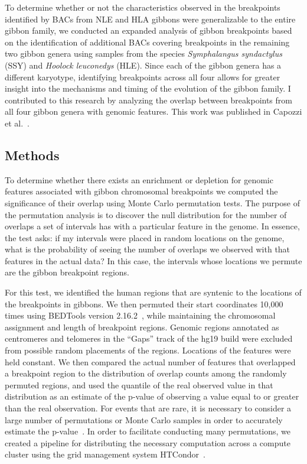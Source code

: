 To determine whether or not the characteristics observed in the breakpoints identified by BACs from NLE and HLA gibbons were generalizable to the entire gibbon family, we conducted an expanded analysis of gibbon breakpoints based on the identification of additional BACs covering breakpoints in the remaining two gibbon genera using samples from the species \emph{Symphalangus syndactylus} (SSY) and \emph{Hoolock leuconedys} (HLE). Since each of the gibbon genera has a different karyotype, identifying breakpoints across all four allows for greater insight into the mechanisms and timing of the evolution of the gibbon family. I contributed to this research by analyzing the overlap between breakpoints from all four gibbon genera with genomic features. This work was published in Capozzi et al.~\cite{Capozzi:2012bb}.

\subsection{Methods}

To determine whether there exists an enrichment or depletion for genomic features associated with gibbon chromosomal breakpoints we computed the significance of their overlap using Monte Carlo permutation tests. The purpose of the permutation analysis is to discover the null distribution for the number of overlaps a set of intervals has with a particular feature in the genome. In essence, the test asks: if my intervals were placed in random locations on the genome, what is the probability of seeing the number of overlaps we observed with that features in the actual data? In this case, the intervals whose locations we permute are the gibbon breakpoint regions.

For this test, we identified the human regions that are syntenic to the locations of the breakpoints in gibbons. We then permuted their start coordinates 10,000 times using BEDTools version 2.16.2~\cite{Quinlan:2010km}, while maintaining the chromosomal assignment and length of breakpoint regions. Genomic regions annotated as centromeres and telomeres in the ``Gaps'' track of the hg19 build were excluded from possible random placements of the regions. Locations of the features were held constant. We then compared the actual number of features that overlapped a breakpoint region to the distribution of overlap counts among the randomly permuted regions, and used the quantile of the real observed value in that distribution as an estimate of the p-value of observing a value equal to or greater than the real observation. For events that are rare, it is necessary to consider a large number of permutations or Monte Carlo samples in order to accurately estimate the p-value~\cite{Rubinstein:2007:SMC:1349778}. In order to facilitate conducting many permutations, we created a pipeline for distributing the necessary computation across a compute cluster using the grid management system HTCondor~\cite{condor-practice}.

